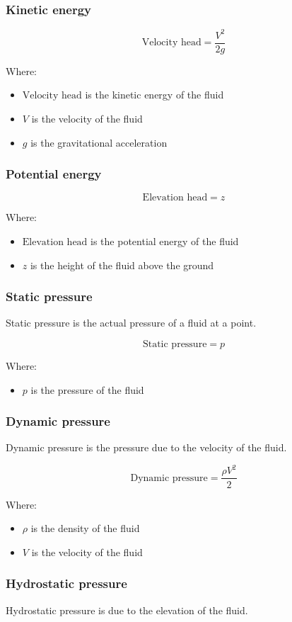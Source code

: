 \documentclass[11pt]{article}
\begin{document}
\subsubsection{Kinetic energy}
\label{sec:org1a622a2}
\[\text{Velocity head} = \frac{V^2}{2g}\]

Where:
\begin{itemize}
\item \(\text{Velocity head}\) is the kinetic energy of the fluid
\item \(V\) is the velocity of the fluid
\item \(g\) is the gravitational acceleration
\end{itemize}
\subsubsection{Potential energy}
\label{sec:org75c2aa2}
\[\text{Elevation head} = z\]

Where:
\begin{itemize}
\item \(\text{Elevation head}\) is the potential energy of the fluid
\item \(z\) is the height of the fluid above the ground
\end{itemize}
\subsubsection{Static pressure}
\label{sec:org644af58}
Static pressure is the actual pressure of a fluid at a point.

\[\text{Static pressure} = p\]

Where:
\begin{itemize}
\item \(p\) is the pressure of the fluid
\end{itemize}
\subsubsection{Dynamic pressure}
\label{sec:org1201a10}
Dynamic pressure is the pressure due to the velocity of the fluid.

\[\text{Dynamic pressure} = \frac{\rho V^2}{2}\]

Where:
\begin{itemize}
\item \(\rho\) is the density of the fluid
\item \(V\) is the velocity of the fluid
\end{itemize}
\subsubsection{Hydrostatic pressure}
\label{sec:orgff4851d}
Hydrostatic pressure is due to the elevation of the fluid.
\end{document}
